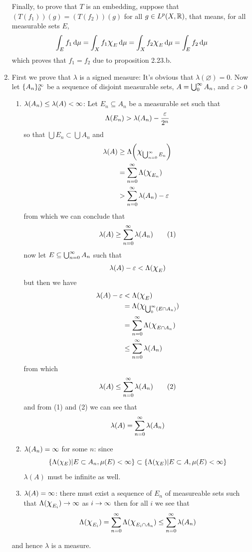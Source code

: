 \documentclass{article}
\begin{document}
\begin{homeworkProblem}
\begin{enumerate}[label=\alph*.]
        Finally, to prove that $T$ is an embedding, suppose that $(T(f_1))(g)=(T(f_2))(g)$ for all $g\in L^p(X,\mathbb{R})$, that means, for all measurable sets $E$,
        \[\int_E f_1\dd\mu = \int_X f_1\Chi_E\dd\mu = \int_X f_2\Chi_E\dd\mu = \int_E f_2\dd\mu\]
        which proves that $f_1=f_2$ due to proposition 2.23.b.
        \item First we prove that $\lambda$ is a signed measure: It's obvious that $\lambda(\varnothing)=0$. Now let $\{A_n\}_0^\infty$ be a sequence of disjoint measurable sets, $A=\bigcup_0^\infty A_n$, and $\varepsilon>0$
        \begin{enumerate}[label=\textbf{case} \#\arabic*:]
            \item $\lambda(A_n)\leq\lambda(A)<\infty$: Let $E_n\subseteq A_n$ be a measurable set such that
            \[\Lambda(E_n)>\lambda(A_n)-\frac{\varepsilon}{2^n}\]
            so that $\bigcup E_n\subset\bigcup A_n$ and
            \begin{align*}
                \lambda(A) &\geq \Lambda\biggl(\Chi_{\bigcup_{n=0}^\i E_n}\biggr) \\
                &=\sum_{n=0}^\i \Lambda(\Chi_{E_n}) \\
                &> \sum_{n=0}^\i\lambda(A_n)-\eps
            \end{align*}
            from which we can conclude that
            \[\lambda(A)\geq\sum_{n=0}^\infty\lambda(A_n) \tag{1}\]
            now let $E\subseteq\bigcup_{n=0}^\infty A_n$ such that
            \[\lambda(A)-\eps<\Lambda(\Chi_E)\]
            but then we have
            \begin{align*}
                \lambda(A)-\eps &< \Lambda(\Chi_E) \\
                &= \Lambda(\Chi_{\bigcup_0^\i (E\cap A_n)}) \\
                &= \sum_{n=0}^\i \Lambda(\Chi_{E\cap A_n}) \\
                &\leq \sum_{n=0}^\i\lambda(A_n)
            \end{align*}
            from which
            \[\lambda(A)\leq\sum_{n=0}^\infty\lambda(A_n) \tag{2}\]
            and from (1) and (2) we can see that
            \[\lambda(A)=\sum_{n=0}^\infty\lambda(A_n)\]
            \item $\lambda(A_n)=\infty$ for some $n$: since
            \[\{\Lambda(\chi_E)|E\subset A_n, \mu(E)<\infty\}\subset \{\Lambda(\chi_E)|E\subset A, \mu(E)<\infty\}\]
            $\lambda(A)$ must be infinite as well.
            \item $\lambda(A)=\infty$: there must exist a sequence of $E_n$ of measureable sets such that $\Lambda(\Chi_{E_i})\to\i$ as $i\to\infty$ then for all $i$ we see that
            \[\Lambda(\Chi_{E_i}) = \sum_{n=0}^\i \Lambda(\Chi_{E_i\cap A_n}) \leq \sum_{n=0}^\i \lambda(A_n)\]
        \end{enumerate}
        and hence $\lambda$ is a measure.


\end{enumerate}
\end{homeworkProblem}
\end{document}
